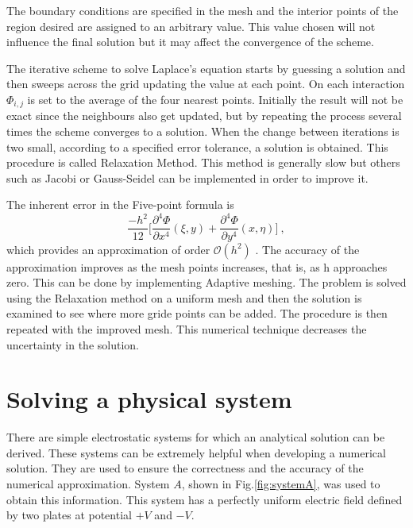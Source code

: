 \documentclass[a4paper]{jpconf}
\begin{document}
The boundary conditions are specified in the mesh and the interior points of the region desired are assigned to an arbitrary value. This value chosen will not influence the final solution but it may affect the convergence of the scheme.

The iterative scheme to solve Laplace's equation starts by guessing a solution and then sweeps across the grid updating the value at each point. On each interaction $\Phi_{i,j}$ is set to the average of the four nearest points. Initially the result will not be exact since the neighbours also get updated, but by repeating the process several times the scheme converges to a solution. When the change between iterations is two small, according to a specified error tolerance, a solution is obtained. This procedure is called Relaxation Method. This method is generally slow but others such as Jacobi or Gauss-Seidel can be implemented in order to improve it.

The inherent error in the Five-point formula is 
\begin{equation}
\frac{-h^2}{12}\bigg[\frac{\partial^4 \Phi}{\partial x^4}(\xi, y) + \frac{\partial^4 \Phi}{\partial y^4}(x,\eta)\bigg]~,
\end{equation}
\noindent which provides an approximation of order $\mathcal{O}(h^2)$ \cite{Cheney.Kincai-NumericalMethods}. The accuracy of the approximation improves as the mesh points increases, that is, as h approaches zero.  This can be done by implementing Adaptive meshing. The problem is solved using the Relaxation method on a uniform mesh and then the solution is examined to see where more gride points can be added. The procedure is then repeated with the improved mesh. This numerical technique decreases the uncertainty in the solution.


\section*{Solving a physical system}
There are simple electrostatic systems for which an analytical solution can be derived. These systems can be extremely helpful when developing a numerical solution. They are used to ensure the correctness and the accuracy of the numerical approximation. System $A$, shown in Fig.\ref{fig:systemA}, was used to obtain this information. This system has a perfectly uniform electric field defined by two plates at potential $+V$ and $-V$. %
\end{document}
